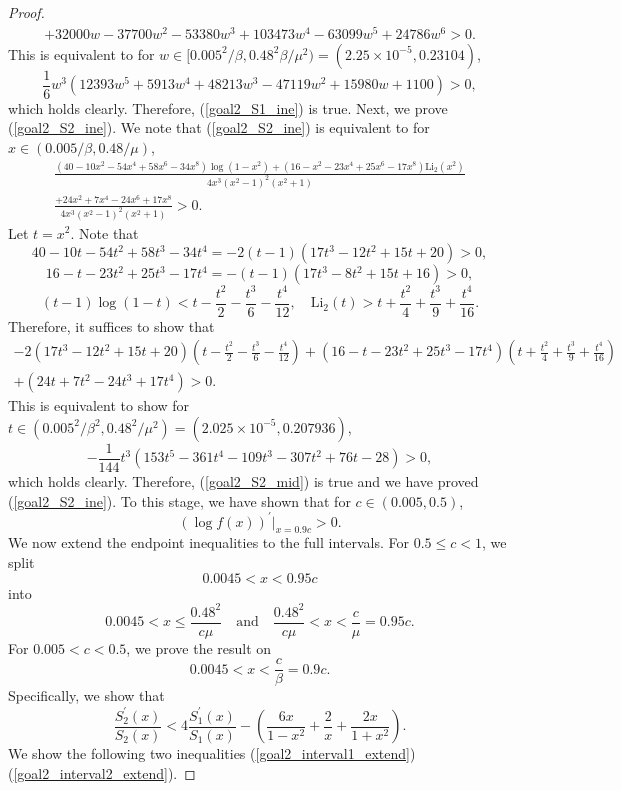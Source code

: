 ﻿\documentclass[10pt]{article}
\begin{document}
\begin{proof}
\begin{align*}
    +32000w- 37700w^2 - 53380w^3 + 103473w^4 - 63099w^5 + 24786w^6>0.
\end{align*}
This is equivalent to for $w\in[0.005^2/\beta, 0.48^2\beta/\mu^2) = (2.25\times 10^{-5}, 0.23104)$,
$$\frac{1}{6}w^3(12393w^5 + 5913w^4 + 48213w^3 - 47119w^2 + 15980w + 1100)>0,
$$
which holds clearly. Therefore, (\ref{goal2_S1_ine}) is true. Next, we prove (\ref{goal2_S2_ine}). We note that (\ref{goal2_S2_ine}) is equivalent to for $x\in(0.005/\beta, 0.48/\mu)$,
\begin{equation}
\begin{aligned}
\frac{(40-10x^2-54x^4+58x^6-34x^8)\log(1-x^2)+(16-x^2-23x^4+25x^6-17x^8)\text{Li}_2(x^2)}{4x^3(x^2 - 1)^2(x^2 + 1)}\\
\frac{+24x^2 + 7x^4 - 24x^6 + 17x^8}{4x^3(x^2 - 1)^2(x^2 + 1)}>0.    
\end{aligned}
 \label{goal2_S2_mid}
\end{equation}
Let $t=x^2$. Note that
$$40-10t-54t^2+58t^3-34t^4 = -2(t-1)(17t^3 - 12t^2+ 15t + 20)>0,
$$
$$16-t-23t^2+25t^3-17t^4 = -(t-1)(17t^3 - 8t^2 + 15t + 16)>0,
$$
$$(t-1)\log(1-t)<t-\frac{t^2}{2}-\frac{t^3}{6}-\frac{t^4}{12},\quad \text{Li}_2(t)>t+\frac{t^2}{4}+\frac{t^3}{9}+\frac{t^4}{16}.
$$
Therefore, it suffices to show that
\begin{align*}
    -2(17t^3 - 12t^2+ 15t + 20)(t-\frac{t^2}{2}-\frac{t^3}{6}-\frac{t^4}{12})+(16-t-23t^2+25t^3-17t^4)(t+\frac{t^2}{4}+\frac{t^3}{9}+\frac{t^4}{16})\\
    +(24t + 7t^2 - 24t^3 + 17t^4)>0.
\end{align*}
This is equivalent to show for $t\in(0.005^2/\beta^2, 0.48^2/\mu^2)=(2.025\times 10^{-5}, 0.207936)$,
$$-\frac{1}{144}t^3(153t^5 - 361t^4 - 109t^3 - 307t^2 + 76t - 28)>0,
$$
which holds clearly. Therefore, (\ref{goal2_S2_mid}) is true and we have proved (\ref{goal2_S2_ine}). To this stage, we have shown that for $c\in(0.005, 0.5)$,
$$(\log f(x))^{'}\bigg|_{x=0.9c} > 0.
$$
We now extend the endpoint inequalities to the full intervals. For
$0.5\leq c<1$, we split
\[
0.0045<x<0.95c
\]
into
\[
0.0045<x\leq \frac{0.48^2}{c\mu}
\quad\text{and}\quad
\frac{0.48^2}{c\mu}<x<\frac{c}{\mu}=0.95c.
\]
For $0.005<c<0.5$, we prove the result on
\[
0.0045<x<\frac{c}{\beta}=0.9c.
\]
Specifically, we show that
\begin{equation}
    \frac{S_2^{'}(x)}{S_2(x)}<4\frac{S_1^{'}(x)}{S_1(x)}-\left(\frac{6x}{1-x^2}+\frac{2}{x}+\frac{2x}{1+x^2}\right).
\end{equation}
We show the following two inequalities (\ref{goal2_interval1_extend})(\ref{goal2_interval2_extend}).


\end{proof}
\end{document}
